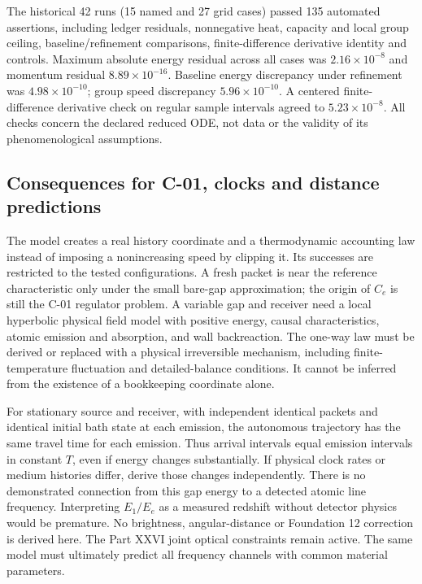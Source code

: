 \documentclass[
  11pt,
  twoside]{article}
\begin{document}
The historical 42 runs (15 named and 27 grid cases) passed 135 automated
assertions, including ledger residuals, nonnegative heat, capacity and
local group ceiling, baseline/refinement comparisons, finite-difference
derivative identity and controls. Maximum absolute energy residual
across all cases was \(2.16\times10^{-8}\) and momentum residual
\(8.89\times10^{-16}\). Baseline energy discrepancy under refinement was
\(4.98\times10^{-10}\); group speed discrepancy \(5.96\times10^{-10}\).
A centered finite-difference derivative check on regular sample
intervals agreed to \(5.23\times10^{-8}\). All checks concern the
declared reduced ODE, not data or the validity of its phenomenological
assumptions.

\subsection{Consequences for C-01, clocks and distance
predictions}\label{consequences-for-c-01-clocks-and-distance-predictions}

The model creates a real history coordinate and a thermodynamic
accounting law instead of imposing a nonincreasing speed by clipping it.
Its successes are restricted to the tested configurations. A fresh
packet is near the reference characteristic only under the small
bare-gap approximation; the origin of \(C_e\) is still the C-01
regulator problem. A variable gap and receiver need a local hyperbolic
physical field model with positive energy, causal characteristics,
atomic emission and absorption, and wall backreaction. The one-way law
must be derived or replaced with a physical irreversible mechanism,
including finite-temperature fluctuation and detailed-balance
conditions. It cannot be inferred from the existence of a bookkeeping
coordinate alone.

For stationary source and receiver, with independent identical packets
and identical initial bath state at each emission, the autonomous
trajectory has the same travel time for each emission. Thus arrival
intervals equal emission intervals in constant \(T\), even if energy
changes substantially. If physical clock rates or medium histories
differ, derive those changes independently. There is no demonstrated
connection from this gap energy to a detected atomic line frequency.
Interpreting \(E_1/E_e\) as a measured redshift without detector physics
would be premature. No brightness, angular-distance or Foundation 12
correction is derived here. The Part XXVI joint optical constraints
remain active. The same model must ultimately predict all frequency
channels with common material parameters.
\end{document}
